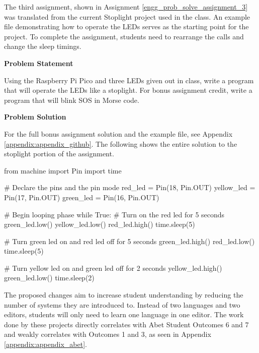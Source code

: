 The third assignment, shown in Assignment \ref{engg_prob_solve_assignment_3} was translated from the 
current Stoplight project used in the class. An example file
demonstrating how to operate the LEDs serves as the starting point for the project. To complete the
assignment, students need to rearrange the  calls and change the sleep timings.

\label{engg_prob_solve_assignment_3}

\begin{tcolorbox}[breakable, enhanced jigsaw, title=DEN 161: Assignment \ref{engg_prob_solve_assignment_3}, 
    colframe=ksu-purple, colback=ksu-gray]

    \textbf{Problem Statement}
    \parindent15pt

    Using the Raspberry Pi Pico and three LEDs given out in class, write a program that will operate
    the LEDs like a stoplight. For bonus assignment credit, write a program that will blink SOS in Morse code.
    
    \tcblower
    \textbf{Problem Solution}
    \parindent15pt
    
    For the full bonus assignment solution and the example file, see Appendix \ref{appendix:appendix_github}. 
    The following shows the entire solution to the stoplight portion of the assignment.

\begin{python}
from machine import Pin
import time

# Declare the pins and the pin mode
red_led = Pin(18, Pin.OUT)
yellow_led = Pin(17, Pin.OUT)
green_led = Pin(16, Pin.OUT)

# Begin looping phase
while True:
    # Turn on the red led for 5 seconds
    green_led.low()
    yellow_led.low()
    red_led.high()
    time.sleep(5)

    # Turn green led on and red led off for 5 seconds
    green_led.high()
    red_led.low()
    time.sleep(5)

    # Turn yellow led on and green led off for 2 seconds
    yellow_led.high()
    green_led.low()
    time.sleep(2)
    \end{python}
\end{tcolorbox}


The proposed changes aim to increase student understanding by reducing the number of systems they are introduced 
to. Instead of two languages and two editors, students will only need to learn one language in one editor. The 
work done by these projects directly correlates with Abet Student Outcomes 6 and 7 and weakly correlates with 
Outcomes 1 and 3, as seen in Appendix \ref{appendix:appendix_abet}.

